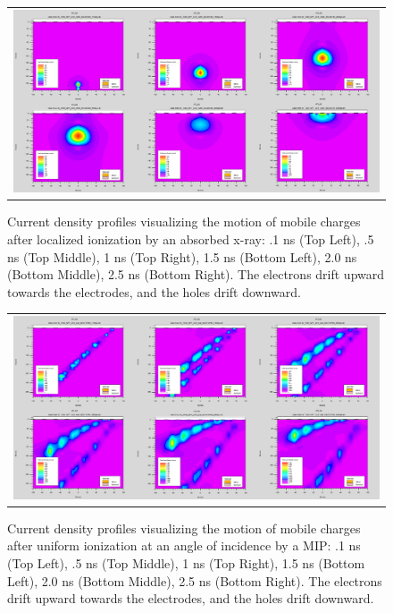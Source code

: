 \begin{refsection}
\begin{figure}[htb]
  \begin{center}
    \begin{tabular}{c}
        \includegraphics[width=.90\textwidth]{fig_FastTiming/CurrentDensity_xray.png}
    \end{tabular}
    \caption{Current density profiles visualizing the motion of mobile charges after localized ionization by an absorbed x-ray:
            .1 \si{\ns} (Top Left), .5 \si{\ns} (Top Middle), 1 \si{\ns} (Top Right), 1.5 \si{\ns} (Bottom Left), 2.0 \si{\ns} (Bottom Middle), 2.5 \si{\ns} (Bottom Right).
            The electrons drift upward towards the electrodes, and the holes drift downward.
            }
    \label{CurrentDensity_xray}
  \end{center}
\end{figure}
\begin{figure}[htb]
  \begin{center}
    \begin{tabular}{c}
        \includegraphics[width=.90\textwidth]{fig_FastTiming/CurrentDensity_MIP.png}
    \end{tabular}
    \caption{Current density profiles visualizing the motion of mobile charges after uniform ionization at an angle of incidence by a MIP:
            .1 \si{\ns} (Top Left), .5 \si{\ns} (Top Middle), 1 \si{\ns} (Top Right), 1.5 \si{\ns} (Bottom Left), 2.0 \si{\ns} (Bottom Middle), 2.5 \si{\ns} (Bottom Right).
            The electrons drift upward towards the electrodes, and the holes drift downward.
            }
    \label{CurrentDensity_MIP}
  \end{center}
\end{figure}


\end{refsection}
